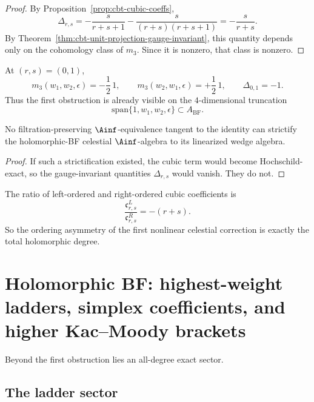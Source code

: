 \begin{proof}
By Proposition~\ref{prop:cbt-cubic-coeffs},
\[
\Delta_{r,s}
=
-\frac{s}{r+s+1}-\frac{s}{(r+s)(r+s+1)}
=
-\frac{s}{r+s}.
\]
By Theorem~\ref{thm:cbt-unit-projection-gauge-invariant}, this quantity depends only on the cohomology class of $m_3$. Since it is nonzero, that class is nonzero.
\end{proof}

\begin{corollary}
\label{cor:cbt-lowest-mode}
\ClaimStatusProvedHere
At $(r,s)=(0,1)$,
\[
m_3(w_1,w_2,\epsilon)=-\frac12\,1,
\qquad
m_3(w_2,w_1,\epsilon)=+\frac12\,1,
\qquad
\Delta_{0,1}=-1.
\]
Thus the first obstruction is already visible on the $4$-dimensional truncation
\[
\mathrm{span}\{1,w_1,w_2,\epsilon\}\subset A_{\mathrm{BF}}.
\]
\end{corollary}

\begin{corollary}
\label{cor:cbt-non-strictifiability}
\ClaimStatusProvedHere
No filtration-preserving $\Ainf$-equivalence tangent to the identity can strictify the holomorphic-BF celestial $\Ainf$-algebra to its linearized wedge algebra.
\end{corollary}

\begin{proof}
If such a strictification existed, the cubic term would become Hochschild-exact, so the gauge-invariant quantities $\Delta_{r,s}$ would vanish. They do not.
\end{proof}

\begin{corollary}
\label{cor:cbt-asymmetry-law}
\ClaimStatusProvedHere
The ratio of left-ordered and right-ordered cubic coefficients is
\[
\frac{\mathfrak c^L_{r,s}}{\mathfrak c^R_{r,s}}=-(r+s).
\]
So the ordering asymmetry of the first nonlinear celestial correction is exactly the total holomorphic degree.
\end{corollary}

\section{Holomorphic BF: highest-weight ladders, simplex coefficients, and higher Kac--Moody brackets}
\label{sec:cbt-bf-ladders}

Beyond the first obstruction lies an all-degree exact sector.

\subsection{The ladder sector}
\label{sec:cbt-ladder-sector}

